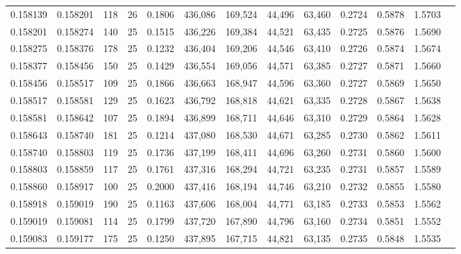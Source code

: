 \begin{tabular}{rrrrrrrrrrrrr}
0.158139 & 0.158201 &   118 &  26 &                                     0.1806 & 436,086 & 169,524 &  44,496 &  63,460 & 0.2724 & 0.5878 & 1.5703 \\
0.158201 & 0.158274 &   140 &  25 &                                     0.1515 & 436,226 & 169,384 &  44,521 &  63,435 & 0.2725 & 0.5876 & 1.5690 \\
0.158275 & 0.158376 &   178 &  25 &                                     0.1232 & 436,404 & 169,206 &  44,546 &  63,410 & 0.2726 & 0.5874 & 1.5674 \\
0.158377 & 0.158456 &   150 &  25 &                                     0.1429 & 436,554 & 169,056 &  44,571 &  63,385 & 0.2727 & 0.5871 & 1.5660 \\
0.158456 & 0.158517 &   109 &  25 &                                     0.1866 & 436,663 & 168,947 &  44,596 &  63,360 & 0.2727 & 0.5869 & 1.5650 \\
0.158517 & 0.158581 &   129 &  25 &                                     0.1623 & 436,792 & 168,818 &  44,621 &  63,335 & 0.2728 & 0.5867 & 1.5638 \\
0.158581 & 0.158642 &   107 &  25 &                                     0.1894 & 436,899 & 168,711 &  44,646 &  63,310 & 0.2729 & 0.5864 & 1.5628 \\
0.158643 & 0.158740 &   181 &  25 &                                     0.1214 & 437,080 & 168,530 &  44,671 &  63,285 & 0.2730 & 0.5862 & 1.5611 \\
0.158740 & 0.158803 &   119 &  25 &                                     0.1736 & 437,199 & 168,411 &  44,696 &  63,260 & 0.2731 & 0.5860 & 1.5600 \\
0.158803 & 0.158859 &   117 &  25 &                                     0.1761 & 437,316 & 168,294 &  44,721 &  63,235 & 0.2731 & 0.5857 & 1.5589 \\
0.158860 & 0.158917 &   100 &  25 &                                     0.2000 & 437,416 & 168,194 &  44,746 &  63,210 & 0.2732 & 0.5855 & 1.5580 \\
0.158918 & 0.159019 &   190 &  25 &                                     0.1163 & 437,606 & 168,004 &  44,771 &  63,185 & 0.2733 & 0.5853 & 1.5562 \\
0.159019 & 0.159081 &   114 &  25 &                                     0.1799 & 437,720 & 167,890 &  44,796 &  63,160 & 0.2734 & 0.5851 & 1.5552 \\
0.159083 & 0.159177 &   175 &  25 &                                     0.1250 & 437,895 & 167,715 &  44,821 &  63,135 & 0.2735 & 0.5848 & 1.5535 \\

\end{tabular}
